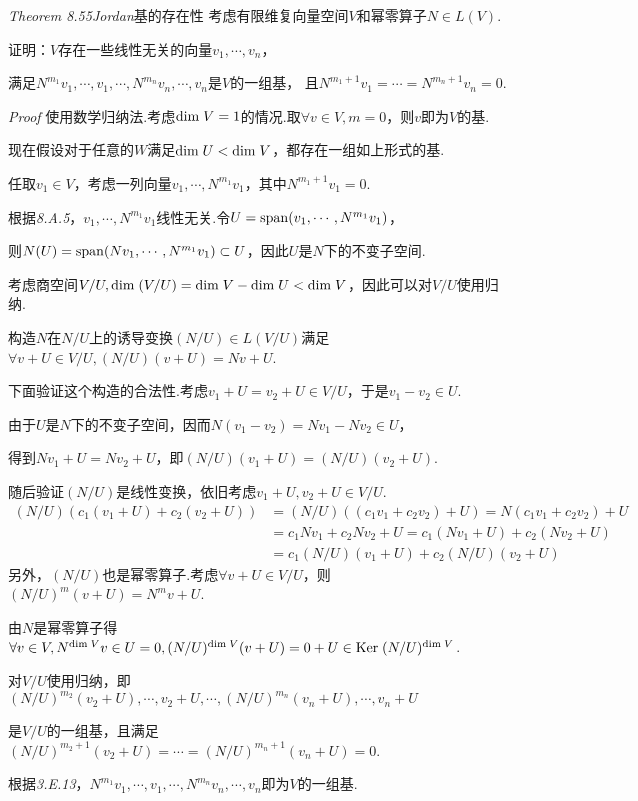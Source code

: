 \textit{Theorem 8.55}\textit{Jordan}{\kaishu 基的存在性}
考虑有限维复向量空间\(V\)和幂零算子\(N \in L(V)\).

证明：\(V\)存在一些线性无关的向量\(v_1,\cdots,v_n\)，

满足\(N^{m_1}v_1,\cdots,v_1,\cdots,N^{m_n}v_n,\cdots,v_n\)是\(V\)的一组基，
且\(N^{m_1+1}v_1=\cdots=N^{m_n+1}v_n=0\).

\textit{Proof}
使用数学归纳法.考虑\(\mathrm{dim \;} V=1\)的情况.取\(\forall v \in V,m=0\)，则\(v\)即为\(V\)的基.

现在假设对于任意的\(W\)满足\(\mathrm{dim \;} U<\mathrm{dim \;} V\)，都存在一组如上形式的基.

任取\(v_1 \in V\)，考虑一列向量\(v_1,\cdots,N^{m_1}v_1\)，其中\(N^{m_1+1}v_1=0\).

根据\textit{8.A.5}，\(v_1,\cdots,N^{m_1}v_1\)线性无关.令\(U=\mathrm{span} (v_1,\cdots,N^{m_1}v_1)\)，

则\(N(U)=\mathrm{span} (Nv_1,\cdots,N^{m_1}v_1) \subset U\)，因此\(U\)是\(N\)下的不变子空间.

考虑商空间\(V/U,\mathrm{dim \;} (V/U)=\mathrm{dim \;} V-\mathrm{dim \;} U < \mathrm{dim \;} V\)，因此可以对\(V/U\)使用归纳.

构造\(N\)在\(N/U\)上的诱导变换\((N/U) \in L(V/U)\)满足\(\forall v+U \in V/U,(N/U)(v+U)=Nv+U\).

下面验证这个构造的合法性.考虑\(v_1+U=v_2+U \in V/U\)，于是\(v_1-v_2 \in U\).

由于\(U\)是\(N\)下的不变子空间，因而\(N(v_1-v_2)=Nv_1-Nv_2 \in U\)，

得到\(Nv_1+U=Nv_2+U\)，即\((N/U)(v_1+U)=(N/U)(v_2+U)\).

随后验证\((N/U)\)是线性变换，依旧考虑\(v_1+U,v_2+U \in V/U\).
    \begin{align*}
        (N/U)(c_1(v_1+U)+c_2(v_2+U))&=(N/U)((c_1v_1+c_2v_2)+U)=N(c_1v_1+c_2v_2)+U \\
        &=c_1Nv_1+c_2Nv_2+U=c_1(Nv_1+U)+c_2(Nv_2+U) \\
        &=c_1(N/U)(v_1+U)+c_2(N/U)(v_2+U) 
    \end{align*}
另外，\((N/U)\)也是幂零算子.考虑\(\forall v+U \in V/U\)，则\((N/U)^m(v+U)=N^m v+U\).

由\(N\)是幂零算子得\(\forall v \in V,N^{\mathrm{dim \;} V}v \in U=0,(N/U)^{\mathrm{dim \;} V}(v+U)=0+U \in \mathrm{Ker \;} (N/U)^{\mathrm{dim \;} V}\).

对\(V/U\)使用归纳，即\((N/U)^{m_2}(v_2+U),\cdots,v_2+U,\cdots,(N/U)^{m_n}(v_n+U),\cdots,v_n+U\)

是\(V/U\)的一组基，且满足\((N/U)^{m_2+1}(v_2+U)=\cdots=(N/U)^{m_n+1}(v_n+U)=0\).

根据\textit{3.E.13}，\(N^{m_1}v_1,\cdots,v_1,\cdots,N^{m_n}v_n,\cdots,v_n\)即为\(V\)的一组基.

